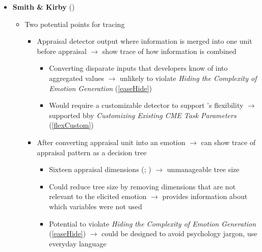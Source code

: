 \begin{itemize}
    \item \textbf{Smith \& Kirby} (\strong)
    \begin{itemize}
        \item Two potential points for tracing~\citep[p.~130]{smith2001toward}
        \begin{itemize}
            \item Appraisal detector output where information is merged into
            one unit before appraisal $\rightarrow$ show trace of how
            information is combined
            \begin{itemize}
                \item Converting disparate inputs that developers know of into
                aggregated values $\rightarrow$ unlikely to violate
                \textit{Hiding the Complexity of Emotion Generation}
                (\ref{easeHide})

                \item Would require a customizable detector to support
                \progname{}'s flexibility $\rightarrow$ supported bby
                \textit{Customizing Existing CME Task Parameters}
                (\ref{flexCustom})
            \end{itemize}

            \item After converting appraisal unit into an emotion $\rightarrow$
            can show trace of appraisal pattern as a decision tree
            \begin{itemize}
                \item Sixteen appraisal dimensions
                (; )
                $\rightarrow$ unmanageable tree size

                \item Could reduce tree size by removing dimensions that are
                not relevant to the elicited emotion $\rightarrow$ provides
                information about which variables were not used

                \item Potential to violate \textit{Hiding the Complexity of
                    Emotion Generation} (\ref{easeHide}) $\rightarrow$ could be
                designed to avoid psychology jargon, use everyday language
            \end{itemize}
        \end{itemize}
    \end{itemize}


\end{itemize}
